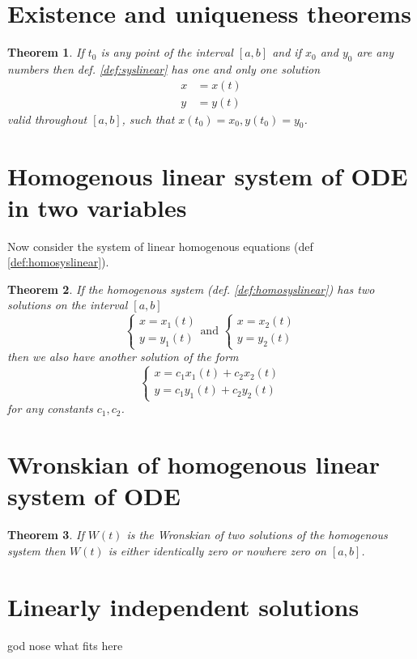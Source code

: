 \documentclass[oneside,11pt,pdftex,final]{book}%
\numberwithin{equation}{section}
\newtheorem{theorem}{Theorem}[chapter]%
\numberwithin{section}{chapter}
\numberwithin{equation}{chapter}
\begin{document}
\section{Existence and uniqueness theorems}
\begin{theorem}
	If $ t_0 $ is any point of the interval $ [a,b] $ and if $ x_0 $ and $ y_0 $ are any numbers then def. \ref{def:syslinear} has one and only one solution 
	\begin{align*}
		x&=x(t)\\
		y&=y(t)
	\end{align*}
valid throughout $ [a,b] $, such that $ x(t_0)=x_0, y(t_0)=y_0 $.
\end{theorem}


\section{Homogenous linear system of ODE in two variables}
Now consider the system of linear homogenous equations (def \ref{def:homosyslinear}).

\begin{theorem}\label{th:linearsolution}
	If the homogenous system (def. \ref{def:homosyslinear}) has two solutions on the interval $ [a,b] $
	\[ \begin{cases}
		x=x_1(t)\\
		y=y_1(t)
	\end{cases} \text{and } \begin{cases}
		x=x_2(t)\\
		y=y_2(t)
	\end{cases}\]
	then we also have another solution of the form 
	\[ \begin{cases}
		x=c_1x_1(t)+c_2x_2(t)\\
		y=c_1y_1(t)+c_2y_2(t)
	\end{cases} \]
	for any constants $ c_1, c_2 $.
\end{theorem}


\section{Wronskian of homogenous linear system of ODE}
\begin{theorem}
	If $ W(t) $ is the Wronskian of two solutions of the homogenous system then $ W(t) $ is either identically zero or nowhere zero on $ [a,b] $.
\end{theorem}


\section{Linearly independent solutions}
god nose what fits here
\end{document}
